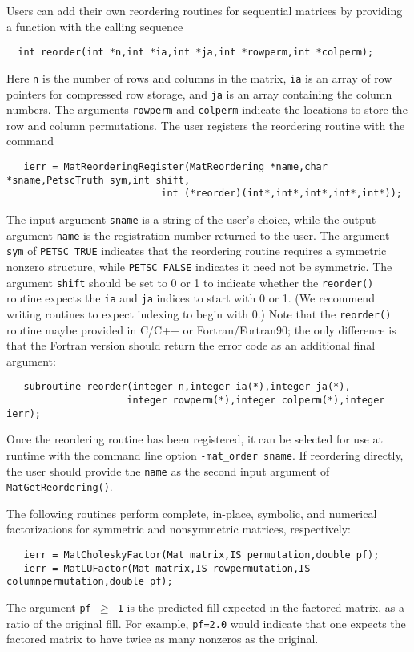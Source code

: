 Users can add their own reordering routines for 
sequential matrices by providing a function with the calling sequence
\begin{verbatim}
  int reorder(int *n,int *ia,int *ja,int *rowperm,int *colperm);
\end{verbatim}
Here {\tt n} is the number of rows and columns in 
the matrix, {\tt ia} is an array of row pointers for compressed row storage, 
and {\tt ja}
is an array containing the column numbers.  The arguments {\tt rowperm} and 
{\tt colperm}
indicate the locations to 
store the row and column permutations. The user registers the reordering routine
with the command
\begin{verbatim}
   ierr = MatReorderingRegister(MatReordering *name,char *sname,PetscTruth sym,int shift,
                           int (*reorder)(int*,int*,int*,int*,int*));
\end{verbatim}
The   
input argument {\tt *sname} is a string of the user's choice, while the output
argument {\tt *name} is the registration number returned to the user.
The argument {\tt sym} of {\tt PETSC\_TRUE} indicates that the reordering routine
requires a symmetric nonzero structure, while {\tt PETSC\_FALSE} indicates 
it need not be symmetric. The argument {\tt shift} should be set to 0 or 1 to
 indicate
whether the {\tt reorder()} routine expects the {\tt ia} and {\tt ja} indices
to start with 0 or 1. (We recommend writing routines to expect indexing 
to begin with 0.) Note that the {\tt reorder()} routine maybe provided in 
C/C++ or Fortran/Fortran90; the only difference is that the Fortran version
should return the error code as an additional final argument:
\begin{verbatim}
   subroutine reorder(integer n,integer ia(*),integer ja(*), 
                     integer rowperm(*),integer colperm(*),integer ierr);
\end{verbatim}

Once the reordering routine has been registered,
it can be selected for use at runtime with the
command line option {\tt -mat\_order sname}.  If reordering directly,
the user should provide the {\tt name} as the second input argument of
{\tt MatGetReordering()}.

The following routines perform complete, in-place, symbolic, and numerical 
factorizations for symmetric and nonsymmetric matrices, respectively:
\begin{verbatim}
   ierr = MatCholeskyFactor(Mat matrix,IS permutation,double pf);
   ierr = MatLUFactor(Mat matrix,IS rowpermutation,IS columnpermutation,double pf); 
\end{verbatim}
The argument {\tt pf $ \ge $ 1} is the predicted fill
expected in the factored matrix, as a ratio of the original fill. 
For example, {\tt pf=2.0} would indicate that one expects the factored
matrix to have twice as many nonzeros as the original.
 

